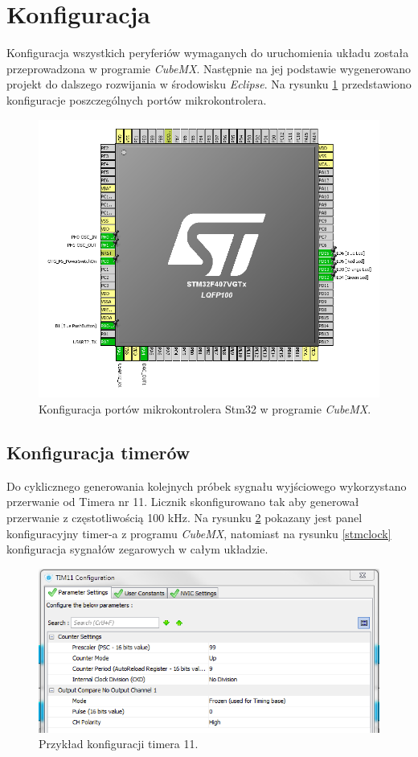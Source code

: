 \section{Konfiguracja}
Konfiguracja wszystkich peryferiów wymaganych do uruchomienia układu została przeprowadzona w programie \textit{CubeMX}. Następnie na jej podstawie wygenerowano projekt do dalszego rozwijania w środowisku \textit{Eclipse}. Na rysunku \ref{stmPorty} przedstawiono konfiguracje poszczególnych portów mikrokontrolera.

\begin{figure}[h!]
	\centering
	\includegraphics[scale = 0.4]{fig/stmPorty.png}
	\caption		
	{Konfiguracja portów mikrokontrolera Stm32 w programie \textit{CubeMX}.}
	\label{stmPorty}
\end{figure}


\subsection{Konfiguracja timerów}
Do cyklicznego generowania kolejnych próbek sygnału wyjściowego wykorzystano przerwanie od Timera nr 11. Licznik skonfigurowano tak aby generował przerwanie z częstotliwością 100 kHz. Na rysunku \ref{timer11} pokazany jest panel konfiguracyjny timer-a z programu \textit{CubeMX}, natomiast na rysunku \ref{stmclock} konfiguracja sygnałów zegarowych w całym układzie.  

\begin{figure}[h!]
	\centering
	\includegraphics[scale = 0.8]{fig/timer11.png}
	\caption		
	{Przykład konfiguracji timera 11.}
	\label{timer11}
\end{figure}

